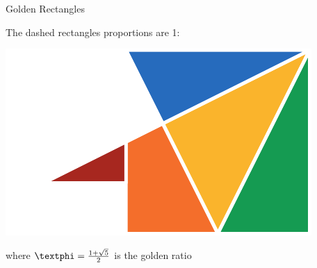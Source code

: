 \documentclass[14pt]{beamer}
\begin{document}

    \begin{frame}{Golden Rectangles}
        \begin{center}
            The dashed rectangles proportions are 1:\textphi
        \end{center}
        \hspace{3.85em} \includegraphics[scale=1.0]{figures/figure030c.pdf} \\
        \begin{center}
            where $\text{\textphi} =\tfrac{1+\sqrt{5}}{2}$ is the golden ratio
        \end{center}
    \end{frame}

\end{document}
